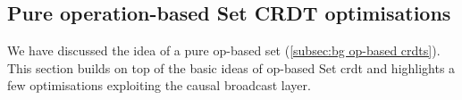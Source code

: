 






\subsection{Pure operation-based Set CRDT optimisations} \label{subsec:impl pawset opt}

We have discussed the idea of a pure op-based set (\cref{subsec:bg op-based crdts}). 
This section builds on top of the basic ideas of op-based Set \acrshort{crdt} and highlights 
a few optimisations exploiting the causal broadcast layer.

